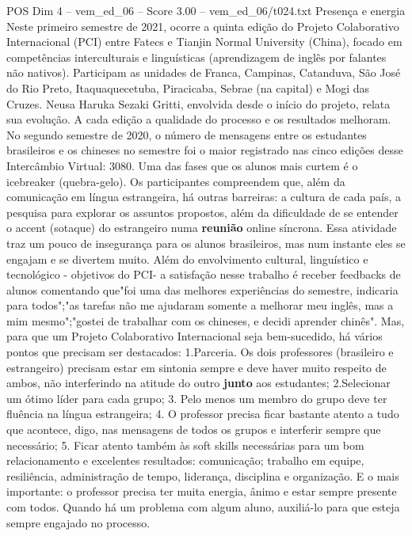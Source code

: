 \begin{textsample}{POS Dim 4 – vem\_ed\_06 – Score 3.00 – vem\_ed\_06/t024.txt}  \label{ex:f4_pos_122}
Presença e energia Neste primeiro semestre de 2021, ocorre a quinta edição do Projeto Colaborativo Internacional (PCI) entre Fatecs e Tianjin Normal University (China), focado em competências interculturais e linguísticas (aprendizagem de inglês por falantes não nativos).
Participam as unidades de Franca, Campinas, Catanduva, São José do Rio Preto, Itaquaquecetuba, Piracicaba, Sebrae (na capital) e Mogi das Cruzes.
Neusa Haruka Sezaki Gritti, envolvida desde o início do projeto, relata sua evolução.
A cada edição a qualidade do processo e os resultados melhoram.
No segundo semestre de 2020, o número de mensagens entre os estudantes brasileiros e os chineses no semestre foi o maior registrado nas cinco edições desse Intercâmbio Virtual: 3080.
Uma das fases que os alunos mais curtem é o icebreaker (quebra-gelo).
Os participantes compreendem que, além da comunicação em língua estrangeira, há outras barreiras: a cultura de cada país, a pesquisa para explorar os assuntos propostos, além da dificuldade de se entender o accent (sotaque) do estrangeiro numa \textbf{reunião} online síncrona.
Essa atividade traz um pouco de insegurança para os alunos brasileiros, mas num instante eles se engajam e se divertem muito.
Além do envolvimento cultural, linguístico e tecnológico - objetivos do PCI- a satisfação nesse trabalho é receber feedbacks de alunos comentando que"foi uma das melhores experiências do semestre, indicaria para todos";"as tarefas não me ajudaram somente a melhorar meu inglês, mas a mim mesmo";"gostei de trabalhar com os chineses, e decidi aprender chinês".
Mas, para que um Projeto Colaborativo Internacional seja bem-sucedido, há vários pontos que precisam ser destacados: 1.Parceria.
Os dois professores (brasileiro e estrangeiro) precisam estar em sintonia sempre e deve haver muito respeito de ambos, não interferindo na atitude do outro \textbf{junto} aos estudantes; 2.Selecionar um ótimo líder para cada grupo; 3.
Pelo menos um membro do grupo deve ter fluência na língua estrangeira; 4.
O professor precisa ficar bastante atento a tudo que acontece, digo, nas mensagens de todos os grupos e interferir sempre que necessário; 5.
Ficar atento também às soft skills necessárias para um bom relacionamento e excelentes resultados: comunicação; trabalho em equipe, resiliência, administração de tempo, liderança, disciplina e organização.
E o mais importante: o professor precisa ter muita energia, ânimo e estar sempre presente com todos.
Quando há um problema com algum aluno, auxiliá-lo para que esteja sempre engajado no processo.

\end{textsample}
